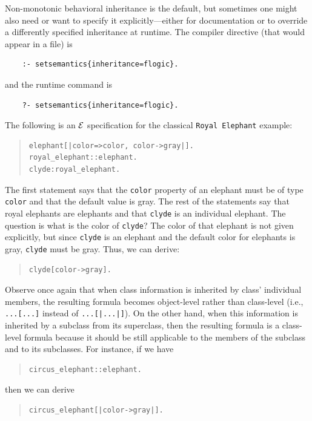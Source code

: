 \documentclass[11pt]{article}
\newcommand{\ERGO}{\mbox{\ensuremath{\cal{E}}\smaller{{\sc{RGO}}}}\xspace}
\newcommand{\FLSYSTEM}{\ERGO}
\begin{document}
Non-monotonic behavioral inheritance is the default, but sometimes one
might also need or want
to specify it explicitly---either for documentation or to override
a differently specified inheritance at runtime. The compiler directive
(that would appear in a file) is
\begin{verbatim}
    :- setsemantics{inheritance=flogic}.
\end{verbatim}
and the runtime command is
\begin{verbatim}
    ?- setsemantics{inheritance=flogic}.
\end{verbatim}
The following is an \FLSYSTEM specification
for the classical {\tt Royal Elephant} example:
\begin{quote}
\begin{verbatim}
elephant[|color=>color, color->gray|].
royal_elephant::elephant.
clyde:royal_elephant.
\end{verbatim}
\end{quote}
The first statement says that the \texttt{color} property of an elephant
must be of type \texttt{color} and that the default value is gray.  
The rest of the statements say that royal elephants are elephants and that
\texttt{clyde} is an individual elephant. 
The question is what is the color of {\tt clyde}? The color of that
elephant is not given explicitly, but since
{\tt clyde} is an elephant and the default color for elephants is gray,
{\tt clyde}
must be gray. Thus, we can derive:
\begin{quote}
\begin{verbatim}
clyde[color->gray].  
\end{verbatim}
\end{quote}
Observe once again that when class information is inherited by class'
individual members, the resulting formula becomes object-level rather than 
class-level (i.e., \texttt{...[...]} instead of \texttt{...[|...|]}).  
On the other
hand, when this information is inherited by a subclass from its superclass,
then the resulting formula is a class-level formula because it should be
still applicable to the members of the subclass and to its subclasses.
For instance, if we have
\begin{quote}
\begin{verbatim}
circus_elephant::elephant.
\end{verbatim}
\end{quote}
then we can derive 
\begin{quote}
\begin{verbatim}
circus_elephant[|color->gray|].  
\end{verbatim}
\end{quote}
\end{document}
